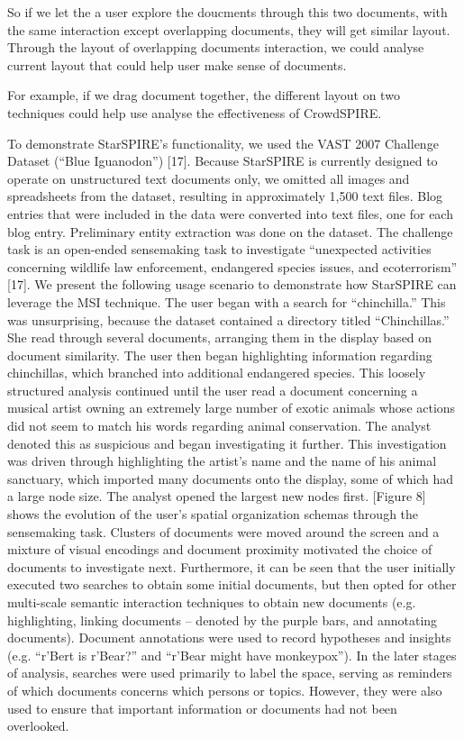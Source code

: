 \documentclass[journal]{vgtc}                %
\begin{document}
So if we let the a user explore the doucments through this two documents, with the same interaction except overlapping documents, they will get similar layout.
Through the layout of overlapping documents interaction, we could analyse current layout that could help user make sense of documents.

For example, if we drag document together, the different layout on two techniques could help use analyse the effectiveness of CrowdSPIRE.

To demonstrate StarSPIRE’s functionality, we used the VAST 2007 Challenge Dataset (“Blue Iguanodon”) [17].
Because StarSPIRE is currently designed to operate on unstructured text documents only, we omitted all images and spreadsheets from the dataset, resulting in approximately 1,500 text files.
Blog entries that were included in the data were converted into text files, one for each blog entry.
Preliminary entity extraction was done on the dataset.
The challenge task is an open-ended sensemaking task to investigate “unexpected activities concerning wildlife law enforcement, endangered species issues, and ecoterrorism” [17].
We present the following usage scenario to demonstrate how StarSPIRE can leverage the MSI technique.
The user began with a search for “chinchilla.” This was unsurprising, because the dataset contained a directory titled “Chinchillas.”
She read through several documents, arranging them in the display based on document similarity.
The user then began highlighting information regarding chinchillas, which branched into additional endangered species.
This loosely structured analysis continued until the user read a document concerning a musical artist owning an extremely large number of exotic animals whose actions did not seem to match his words regarding animal conservation.
The analyst denoted this as suspicious and began investigating it further.
 This investigation was driven through highlighting the artist’s name and the name of his animal sanctuary, which imported many documents onto the display, some of which had a large node size.
  The analyst opened the largest new nodes first.
[Figure 8] shows the evolution of the user’s spatial organization schemas through the sensemaking task.
Clusters of documents were moved around the screen and a mixture of visual encodings and document proximity motivated the choice of documents to investigate next.
Furthermore, it can be seen that the user initially executed two searches to obtain some initial documents, but then opted for other multi-scale semantic interaction techniques to obtain new documents (e.g. highlighting, linking documents – denoted by the purple bars, and annotating documents).
Document annotations were used to record hypotheses and insights (e.g. “r’Bert is r’Bear?” and “r’Bear might have monkeypox”).
In the later stages of analysis, searches were used primarily to label the space, serving as reminders of which documents concerns which persons or topics.
However, they were also used to ensure that important information or documents had not been overlooked.
\end{document}
